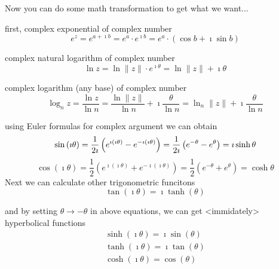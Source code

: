 \documentclass[11pt,a4paper,openany,oneside]{extreport}
\begin{document}
Now you can do some math transformation to get what we want...

first, complex exponential of complex number
 \begin{displaymath}
  e^z = e^{a+\imath b} = e^a\cdot e^{\imath b} = e^a\cdot\left( \cos b +\imath \sin b \right)
 \end{displaymath}

complex natural logarithm of complex number
 \begin{displaymath}
  \ln{z} = \ln{ \|z\| \cdot e^{\imath \theta} } = \ln{\|z\|}+\imath \theta
 \end{displaymath}

complex logarithm (any base) of complex number
 \begin{displaymath}
  \log_n{z} = \frac{\ln z}{\ln n} = \frac{ \ln{\|z\|} }{ \ln n}+\imath\frac{ \theta }{ \ln n}= \ln_n{\|z\|} + \imath\frac{ \theta }{ \ln n}
 \end{displaymath}

using Euler formulas for complex argument we can obtain
 \begin{displaymath}
  \sin{\left(\imath \theta\right)} =  \frac{1}{2\imath}\left( e^{\imath (\imath\theta)}-e^{-\imath (\imath\theta)} \right) 
		=  \frac{1}{2\imath}\left( e^{-\theta}-e^{\theta} \right) = \imath \sinh{\theta} \\
 \end{displaymath}
 \begin{displaymath}
    \cos{\left(\imath \theta \right)} =  \frac{1}{2}\left( e^{\imath (\imath\theta)}+e^{-\imath (\imath\theta)} \right) 
	= \frac{1}{2}\left( e^{-\theta}+e^{\theta} \right) = \cosh{\theta}
 \end{displaymath}
 Next we can calculate other trigonometric funcitons
 \begin{displaymath}
  \tan{\left(\imath \theta \right)} =  \imath \tanh(\theta)
 \end{displaymath}
 
and by setting $\theta \rightarrow -\theta$ in above equations, we can get <immidately> hyperbolical functions
 \begin{displaymath}
  \begin{array}{l}
  \sinh(\imath \theta) = \imath \sin(\theta) \\
  \tanh(\imath \theta) = \imath \tan(\theta) \\
  \cosh(\imath \theta) = \cos(\theta) \\
  \end{array}
 \end{displaymath}
 
\end{document}
